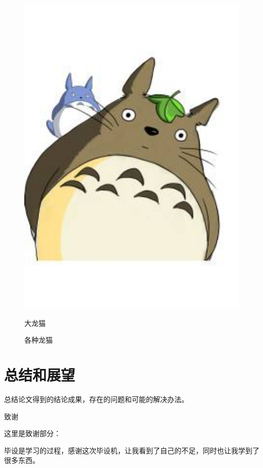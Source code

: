 \documentclass[12pt]{ctexart}
\begin{document}
\begin{spacing}{1.5}
\begin{figure}[h]
\begin{minipage}[t]{0.3\linewidth}
		\includegraphics[width=1\textwidth]{figures/6.jpg}
		\caption*{大龙猫}
	\end{minipage}
	\caption{各种龙猫}
	\label{2x}
\end{figure}
\clearpage
\section{总结和展望}
总结论文得到的结论成果，存在的问题和可能的解决办法。
\clearpage%


\clearpage%
\fancyhf{}%
\thispagestyle{fancy}
\lhead{}  \rhead{}
\lfoot{} \cfoot{\thepage} \rfoot{}
\renewcommand\headrulewidth{0.3pt}
\begin{center}
	\heiti {} 致谢
\end{center}
这里是致谢部分：

毕设是学习的过程，感谢这次毕设机，让我看到了自己的不足，同时也让我学到了很多东西。
\end{spacing}
\newpage
\fancyhf{}%
\pagestyle{fancy}
\lhead{}  \rhead{}
\lfoot{} \cfoot{\thepage} \rfoot{}
\end{document}
